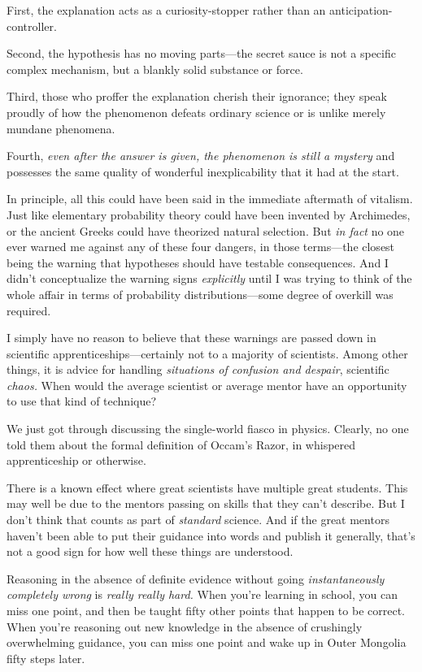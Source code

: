 {
 First, the explanation acts as a curiosity-stopper rather than an
anticipation-controller.}

{
 Second, the hypothesis has no moving parts---the secret sauce is
not a specific complex mechanism, but a blankly solid substance or
force.}

{
 Third, those who proffer the explanation cherish their ignorance;
they speak proudly of how the phenomenon defeats ordinary science or is
unlike merely mundane phenomena.}

{
 Fourth, \textit{even after the answer is given, the phenomenon is
still a mystery} and possesses the same quality of wonderful
inexplicability that it had at the start.}

{
 In principle, all this could have been said in the immediate
aftermath of vitalism. Just like elementary probability theory could
have been invented by Archimedes, or the ancient Greeks could have
theorized natural selection. But \textit{in fact} no one ever warned me
against any of these four dangers, in those terms---the closest being
the warning that hypotheses should have testable consequences. And I
didn't conceptualize the warning signs
\textit{explicitly} until I was trying to think of the whole affair in
terms of probability distributions---some degree of overkill was
required.}

{
 I simply have no reason to believe that these warnings are passed
down in scientific apprenticeships---certainly not to a majority of
scientists. Among other things, it is advice for handling
\textit{situations of confusion and despair}, scientific
\textit{chaos.} When would the average scientist or average mentor have
an opportunity to use that kind of technique?}

{
 We just got through discussing the single-world fiasco in physics.
Clearly, no one told them about the formal definition of
Occam's Razor, in whispered apprenticeship or
otherwise.}

{
 There is a known effect where great scientists have multiple great
students. This may well be due to the mentors passing on skills that
they can't describe. But I don't think
that counts as part of \textit{standard} science. And if the great
mentors haven't been able to put their guidance into
words and publish it generally, that's not a good sign
for how well these things are understood.}

{
 Reasoning in the absence of definite evidence without going
\textit{instantaneously completely wrong} is \textit{really really
hard.} When you're learning in school, you can miss one
point, and then be taught fifty other points that happen to be correct.
When you're reasoning out new knowledge in the absence
of crushingly overwhelming guidance, you can miss one point and wake up
in Outer Mongolia fifty steps later.}

